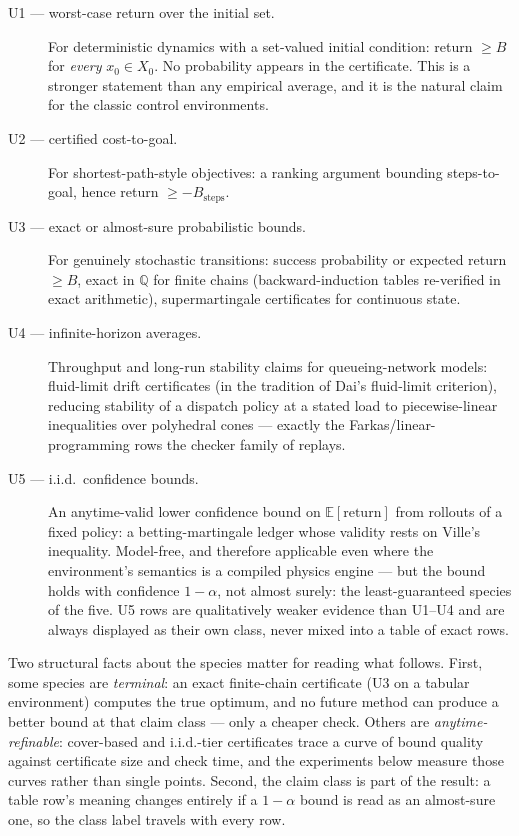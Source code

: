 \begin{description}
\item[U1 --- worst-case return over the initial set.] For deterministic
  dynamics with a set-valued initial condition: return $\ge B$ for
  \emph{every} $x_0 \in X_0$. No probability appears in the
  certificate. This is a stronger statement than any empirical average,
  and it is the natural claim for the classic control environments.
\item[U2 --- certified cost-to-goal.] For shortest-path-style
  objectives: a ranking argument bounding steps-to-goal, hence return
  $\ge -B_{\text{steps}}$.
\item[U3 --- exact or almost-sure probabilistic bounds.] For genuinely
  stochastic transitions: success probability or expected return
  $\ge B$, exact in $\mathbb{Q}$ for finite chains (backward-induction
  tables re-verified in exact arithmetic), supermartingale certificates
  for continuous state.
\item[U4 --- infinite-horizon averages.] Throughput and long-run
  stability claims for queueing-network models: fluid-limit drift
  certificates (in the tradition of Dai's fluid-limit criterion),
  reducing stability of a dispatch policy at a stated load to
  piecewise-linear inequalities over polyhedral cones --- exactly the
  Farkas/linear-programming rows the checker family of
   replays.
\item[U5 --- i.i.d.\ confidence bounds.] An anytime-valid
  lower confidence bound on $\mathbb{E}[\text{return}]$ from rollouts
  of a fixed policy: a betting-martingale ledger whose validity rests
  on Ville's inequality. Model-free, and therefore applicable even
  where the environment's semantics is a compiled physics engine ---
  but the bound holds with confidence $1-\alpha$, not almost surely:
  the least-guaranteed species of the five. U5 rows are qualitatively
  weaker evidence than U1--U4 and are always displayed as their own
  class, never mixed into a table of exact rows.
\end{description}

Two structural facts about the species matter for reading what
follows. First, some species are \emph{terminal}: an exact
finite-chain certificate (U3 on a tabular environment) computes the
true optimum, and no future method can produce a better bound at that
claim class --- only a cheaper check. Others are
\emph{anytime-refinable}: cover-based and i.i.d.-tier certificates
trace a curve of bound quality against certificate size and check
time, and the experiments below measure those curves rather than
single points. Second, the claim class is part of the result: a table
row's meaning changes entirely if a $1-\alpha$ bound is read as an
almost-sure one, so the class label travels with every row.

